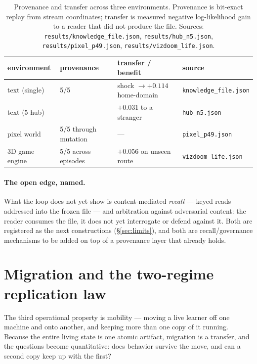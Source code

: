 \documentclass[11pt]{article}
\theoremstyle{definition}
\newcommand{\code}[1]{\texttt{#1}}
\begin{document}
\begin{table}[tb]
\centering
\caption{Provenance and transfer across three environments. Provenance is
bit-exact replay from stream coordinates; transfer is measured negative
log-likelihood gain to a reader that did not produce the file. Sources:
\code{results/knowledge\_file.json}, \code{results/hub\_n5.json},
\code{results/pixel\_p49.json}, \code{results/vizdoom\_life.json}.}
\label{tab:provenance}
\begin{tabular}{@{}llll@{}}
\toprule
environment & provenance & transfer / benefit & source \\
\midrule
text (single) & 5/5 & shock $\to +\num{0.114}$ home-domain & \code{knowledge\_file.json}\\
text (5-hub) & --- & $+\num{0.031}$ to a stranger & \code{hub\_n5.json}\\
pixel world & 5/5 through mutation & --- & \code{pixel\_p49.json}\\
3D game engine & 5/5 across episodes & $+\num{0.056}$ on unseen route & \code{vizdoom\_life.json}\\
\bottomrule
\end{tabular}
\end{table}

\paragraph{The open edge, named.} What the loop does not yet show is
content-mediated \emph{recall} --- keyed reads addressed into the frozen file
--- and arbitration against adversarial content: the reader consumes the file,
it does not yet interrogate or defend against it. Both are registered as the
next constructions (\S\ref{sec:limits}), and both are recall/governance
mechanisms to be added on top of a provenance layer that already holds.

\section{Migration and the two-regime replication law}
\label{sec:replication}

The third operational property is mobility --- moving a live learner off one
machine and onto another, and keeping more than one copy of it running. Because
the entire living state is one atomic artifact, migration is a transfer, and
the questions become quantitative: does behavior survive the move, and can a
second copy keep up with the first?
\end{document}
